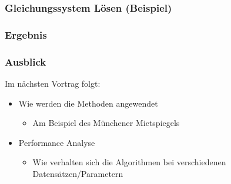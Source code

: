 \documentclass{beamer}
\begin{document}
\begin{frame}
  \frametitle{Gleichungssystem Lösen (Beispiel)}
  
\end{frame}

%  

\begin{frame}
  \frametitle{Ergebnis}
\end{frame}

\begin{frame}
  \frametitle{Ausblick}
  
  Im nächsten Vortrag folgt:
  \begin{itemize}
  \item Wie werden die Methoden angewendet
    \begin{itemize}
    \item Am Beispiel des Münchener Mietspiegels
    \end{itemize}
  \item Performance Analyse
    \begin{itemize}
    \item Wie verhalten sich die Algorithmen bei verschiedenen Datensätzen/Parametern 
    \end{itemize}
  \end{itemize}

\end{frame}
\end{document}
